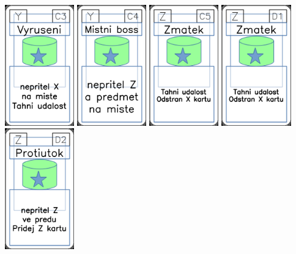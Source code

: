 \documentclass[a4paper]{article}
\begin{document}
	\includegraphics[width=3.0cm]{img-5_42}
	\includegraphics[width=3.0cm]{img-5_43}
	\includegraphics[width=3.0cm]{img-5_44}
	\includegraphics[width=3.0cm]{img-5_45}
	\includegraphics[width=3.0cm]{img-5_46}
\end{document}
